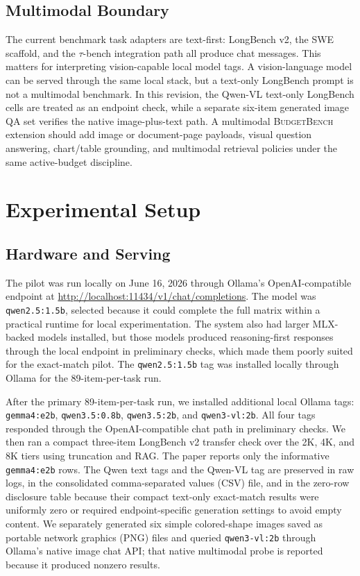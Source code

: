 \documentclass[11pt]{article}
\newcommand{\BudgetBench}{\textsc{BudgetBench}}
\newcommand{\RunModel}{\texttt{qwen2.5:1.5b}}
\newcommand{\OllamaEndpoint}{\url{http://localhost:11434/v1/chat/completions}}
\begin{document}
\subsection{Multimodal Boundary}

The current benchmark task adapters are text-first: LongBench v2, the SWE
scaffold, and the $\tau$-bench integration path all produce chat messages.
This matters for interpreting vision-capable local model tags.  A
vision-language model can be served through the same local stack, but a
text-only LongBench prompt is not a multimodal benchmark.  In this revision,
the Qwen-VL text-only LongBench cells are treated as an endpoint
check, while a separate six-item generated image QA set verifies the native
image-plus-text path.  A multimodal \BudgetBench{} extension should add
image or document-page payloads, visual question answering, chart/table
grounding, and multimodal retrieval policies under the same active-budget
discipline.

\section{Experimental Setup}

\subsection{Hardware and Serving}

The pilot was run locally on June 16, 2026 through Ollama's OpenAI-compatible
endpoint at \OllamaEndpoint.  The model was \RunModel{}, selected because it
could complete the full matrix within a practical runtime for local
experimentation.  The system also had larger MLX-backed models installed, but
those models produced reasoning-first responses through the local endpoint in
preliminary checks, which made them poorly suited for the exact-match pilot.
The \RunModel{} tag was installed locally through Ollama for the 89-item-per-task run.

After the primary 89-item-per-task run, we installed additional local Ollama tags:
\texttt{gemma4:e2b}, \texttt{qwen3.5:0.8b}, \texttt{qwen3.5:2b}, and
\texttt{qwen3-vl:2b}.  All four tags responded through the OpenAI-compatible
chat path in preliminary checks.  We then ran a compact three-item LongBench v2
transfer check over the 2K, 4K, and 8K tiers using truncation and RAG.  The
paper reports only the informative \texttt{gemma4:e2b} rows.  The Qwen text
tags and the Qwen-VL tag are preserved in raw logs, in the consolidated
comma-separated values (CSV) file, and in the zero-row disclosure table because
their compact text-only exact-match results were uniformly zero or required
endpoint-specific generation settings to avoid empty content.  We separately generated six simple colored-shape
images saved as portable network graphics (PNG) files and queried
\texttt{qwen3-vl:2b} through Ollama's native image chat API; that
native multimodal probe is reported because it produced nonzero results.
\end{document}
